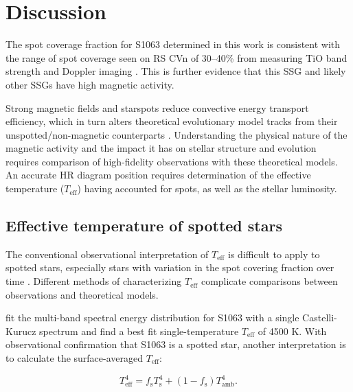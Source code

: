 \documentclass[trackchanges]{aastex631}
\begin{document}
\section{Discussion}
\label{sec:discussion}

The spot coverage fraction for S1063 determined in this work is consistent with the range of spot coverage seen on RS CVn of 30--40\% from measuring TiO band strength \citep{oneal96, oneal98, oneal04} and Doppler imaging \citep{hackman12}. This is further evidence that this SSG and likely other SSGs have high magnetic activity.

Strong magnetic fields and starspots reduce convective energy transport efficiency, which in turn alters theoretical evolutionary model tracks from their unspotted/non-magnetic counterparts \citep{2013ApJ...779..183F,somers15,somers15b,somers20}. Understanding the physical nature of the magnetic activity and the impact it has on stellar structure and evolution requires comparison of high-fidelity observations with these theoretical models.  An accurate HR diagram position requires determination of the effective temperature ($T_{\textrm{eff}}$) having accounted for spots, as well as the stellar luminosity.

\subsection{Effective temperature of spotted stars}
The conventional observational interpretation of $T_{\textrm{eff}}$ is difficult to apply to spotted stars, especially stars with variation in the spot covering fraction over time \citep{gullysantiago17}. Different methods of characterizing $T_{\textrm{eff}}$ complicate  comparisons between observations and theoretical models.


\citet{leiner17} fit the multi-band spectral energy distribution for S1063 with a single Castelli-Kurucz spectrum \citep{2003IAUS..210P.A20C} and find a best fit single-temperature $T_{\textrm{eff}}$ of 4500 K. With observational confirmation that S1063 is a spotted star, another interpretation is to calculate the surface-averaged $T_{\textrm{eff}}$:

\begin{equation}
T_{\textrm{eff}}^4 = f_{\textrm{s}} T_{\textrm{s}}^4 + (1 -f_{\textrm{s}}) T_{\textrm{amb}}^4 .
\end{equation}
\end{document}
